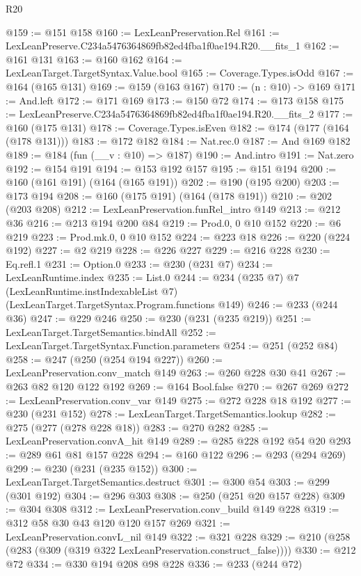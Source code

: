 \begin{lexlean}{R20}
\begin{coremodule}
@159 := @151 @158
@160 := LexLeanPreservation.Rel
@161 := LexLeanPreserve.C234a5476364869fb82ed4fba1f0ae194.R20.__fits_1
@162 := @161 @131
@163 := @160 @162
@164 := LexLeanTarget.TargetSyntax.Value.bool
@165 := Coverage.Types.isOdd
@167 := @164 (@165 @131)
@169 := @159 (@163 @167)
@170 := (n : @10) -> @169
@171 := And.left
@172 := @171 @169
@173 := @150 @72
@174 := @173 @158
@175 := LexLeanPreserve.C234a5476364869fb82ed4fba1f0ae194.R20.__fits_2
@177 := @160 (@175 @131)
@178 := Coverage.Types.isEven
@182 := @174 (@177 (@164 (@178 @131)))
@183 := @172 @182
@184 := Nat.rec.{0}
@187 := And @169 @182
@189 := @184 (fun (__v : @10) => @187)
@190 := And.intro
@191 := Nat.zero
@192 := @154 @191
@194 := @153 @192 @157
@195 := @151 @194
@200 := @160 (@161 @191) (@164 (@165 @191))
@202 := @190 (@195 @200)
@203 := @173 @194
@208 := @160 (@175 @191) (@164 (@178 @191))
@210 := @202 (@203 @208)
@212 := LexLeanPreservation.funRel_intro @149
@213 := @212 @36
@216 := @213 @194 @200 @84
@219 := Prod.{0, 0} @10 @152
@220 := @6 @219
@223 := Prod.mk.{0, 0} @10 @152
@224 := @223 @18
@226 := @220 (@224 @192)
@227 := @2 @219
@228 := @226 @227
@229 := @216 @228
@230 := Eq.refl.{1}
@231 := Option.{0}
@233 := @230 (@231 @7)
@234 := LexLeanRuntime.index
@235 := List.{0}
@244 := @234
    (@235 @7)
    @7
    (LexLeanRuntime.instIndexableList @7)
    (LexLeanTarget.TargetSyntax.Program.functions @149)
@246 := @233 (@244 @36)
@247 := @229 @246
@250 := @230 (@231 (@235 @219))
@251 := LexLeanTarget.TargetSemantics.bindAll
@252 := LexLeanTarget.TargetSyntax.Function.parameters
@254 := @251 (@252 @84)
@258 := @247 (@250 (@254 @194 @227))
@260 := LexLeanPreservation.conv_match @149
@263 := @260 @228 @30 @41
@267 := @263 @82 @120 @122 @192
@269 := @164 Bool.false
@270 := @267 @269
@272 := LexLeanPreservation.conv_var @149
@275 := @272 @228 @18 @192
@277 := @230 (@231 @152)
@278 := LexLeanTarget.TargetSemantics.lookup
@282 := @275 (@277 (@278 @228 @18))
@283 := @270 @282
@285 := LexLeanPreservation.convA_hit @149
@289 := @285 @228 @192 @54 @20
@293 := @289 @61 @81 @157 @228
@294 := @160 @122
@296 := @293 (@294 @269)
@299 := @230 (@231 (@235 @152))
@300 := LexLeanTarget.TargetSemantics.destruct
@301 := @300 @54
@303 := @299 (@301 @192)
@304 := @296 @303
@308 := @250 (@251 @20 @157 @228)
@309 := @304 @308
@312 := LexLeanPreservation.conv_build @149 @228
@319 := @312 @58 @30 @43 @120 @120 @157 @269
@321 := LexLeanPreservation.convL_nil @149
@322 := @321 @228
@329 := @210 (@258 (@283 (@309 (@319 @322 LexLeanPreservation.construct_false))))
@330 := @212 @72
@334 := @330 @194 @208 @98 @228
@336 := @233 (@244 @72)

\end{coremodule}
\end{lexlean}
